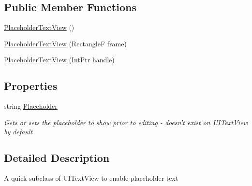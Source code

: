 \subsection*{Public Member Functions}
\begin{DoxyCompactItemize}
\item 
\hyperlink{class_field_service_1_1i_o_s_1_1_placeholder_text_view_a0ea01bc625514b795128dc8d58c535ea}{Placeholder\+Text\+View} ()
\item 
\hyperlink{class_field_service_1_1i_o_s_1_1_placeholder_text_view_a5c82751d2260399ba1fc90747e5e6024}{Placeholder\+Text\+View} (Rectangle\+F frame)
\item 
\hyperlink{class_field_service_1_1i_o_s_1_1_placeholder_text_view_a4662b33788c911a197e3cc4db6786409}{Placeholder\+Text\+View} (Int\+Ptr handle)
\end{DoxyCompactItemize}
\subsection*{Properties}
\begin{DoxyCompactItemize}
\item 
string \hyperlink{class_field_service_1_1i_o_s_1_1_placeholder_text_view_a1d0d8eaf2c61ef8fc99f4788c22a35d6}{Placeholder}
\begin{DoxyCompactList}\small\item\em Gets or sets the placeholder to show prior to editing -\/ doesn't exist on U\+I\+Text\+View by default \end{DoxyCompactList}\end{DoxyCompactItemize}


\subsection{Detailed Description}
A quick subclass of U\+I\+Text\+View to enable placeholder text 



